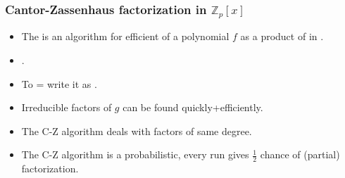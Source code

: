 \begin{frame}
\frametitle{Cantor-Zassenhaus factorization in $\mathbb Z_p[x]$}
\begin{itemize}
\item The  is an algorithm for efficient  of a polynomial $f$ as a product of  in .
\item<2-> .
\item<3-> To  = write it as .
\item<4-> Irreducible factors of $g$  can be found quickly+efficiently.
\item<5-> The C-Z algorithm deals with factors of same degree.
\item<6-> The C-Z algorithm is a probabilistic, every run gives $\frac{1}{2}$ chance of (partial) factorization.
\end{itemize}
\end{frame}

